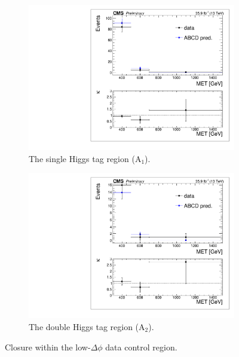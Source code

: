 \begin{figure}
\begin{subfigure}[b]{0.5\textwidth}
\centering
\includegraphics[trim={5px 5px 5px 5px},clip,width=\textwidth]{figs/SUS17006/dataClosure_single-tagSR_lowDphi.pdf}
\caption{The single Higgs tag region (A$_{1}$).}
\end{subfigure}
\begin{subfigure}[b]{0.5\textwidth}
\centering
\includegraphics[trim={5px 5px 5px 5px},clip,width=\textwidth]{figs/SUS17006/dataClosure_double-tagSR_lowDphi.pdf} 
\caption{The double Higgs tag region (A$_{2}$).}
\end{subfigure}
\caption{Closure within the low-$\Delta\phi$ data control region.}
\label{fig:closurelowdphi}
\end{figure}

